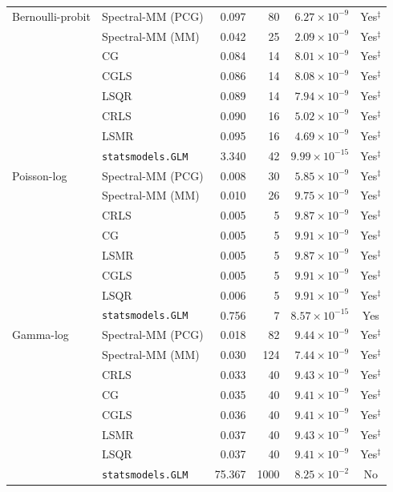 \begin{longtable}{llrrrc}
\midrule
Bernoulli-probit & Spectral-MM (PCG) & 0.097 & 80 & $6.27\times10^{-9}$ & Yes$^{\ddagger}$ \\
 & Spectral-MM (MM) & 0.042 & 25 & $2.09\times10^{-9}$ & Yes$^{\ddagger}$ \\
 & CG & 0.084 & 14 & $8.01\times10^{-9}$ & Yes$^{\ddagger}$ \\
 & CGLS & 0.086 & 14 & $8.08\times10^{-9}$ & Yes$^{\ddagger}$ \\
 & LSQR & 0.089 & 14 & $7.94\times10^{-9}$ & Yes$^{\ddagger}$ \\
 & CRLS & 0.090 & 16 & $5.02\times10^{-9}$ & Yes$^{\ddagger}$ \\
 & LSMR & 0.095 & 16 & $4.69\times10^{-9}$ & Yes$^{\ddagger}$ \\
 & \texttt{statsmodels.GLM} & 3.340 & 42 & $9.99\times10^{-15}$ & Yes$^{\ddagger}$ \\
\midrule
Poisson-log & Spectral-MM (PCG) & 0.008 & 30 & $5.85\times10^{-9}$ & Yes$^{\ddagger}$ \\
 & Spectral-MM (MM) & 0.010 & 26 & $9.75\times10^{-9}$ & Yes$^{\ddagger}$ \\
 & CRLS & 0.005 & 5 & $9.87\times10^{-9}$ & Yes$^{\ddagger}$ \\
 & CG & 0.005 & 5 & $9.91\times10^{-9}$ & Yes$^{\ddagger}$ \\
 & LSMR & 0.005 & 5 & $9.87\times10^{-9}$ & Yes$^{\ddagger}$ \\
 & CGLS & 0.005 & 5 & $9.91\times10^{-9}$ & Yes$^{\ddagger}$ \\
 & LSQR & 0.006 & 5 & $9.91\times10^{-9}$ & Yes$^{\ddagger}$ \\
 & \texttt{statsmodels.GLM} & 0.756 & 7 & $8.57\times10^{-15}$ & Yes \\
\midrule
Gamma-log & Spectral-MM (PCG) & 0.018 & 82 & $9.44\times10^{-9}$ & Yes$^{\ddagger}$ \\
 & Spectral-MM (MM) & 0.030 & 124 & $7.44\times10^{-9}$ & Yes$^{\ddagger}$ \\
 & CRLS & 0.033 & 40 & $9.43\times10^{-9}$ & Yes$^{\ddagger}$ \\
 & CG & 0.035 & 40 & $9.41\times10^{-9}$ & Yes$^{\ddagger}$ \\
 & CGLS & 0.036 & 40 & $9.41\times10^{-9}$ & Yes$^{\ddagger}$ \\
 & LSMR & 0.037 & 40 & $9.43\times10^{-9}$ & Yes$^{\ddagger}$ \\
 & LSQR & 0.037 & 40 & $9.41\times10^{-9}$ & Yes$^{\ddagger}$ \\
 & \texttt{statsmodels.GLM} & 75.367 & 1000 & $8.25\times10^{-2}$ & No \\

\end{longtable}
